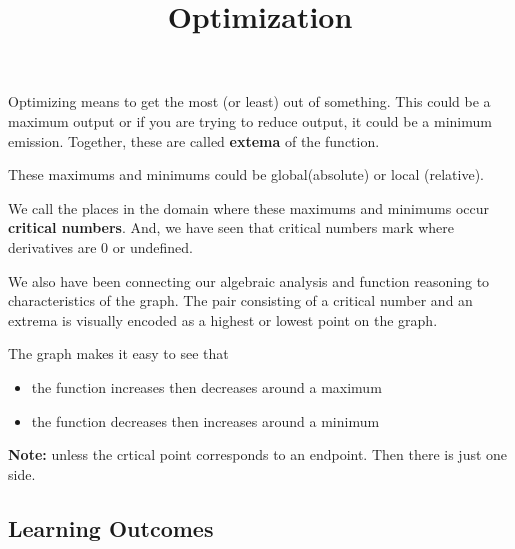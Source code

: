 \documentclass{ximera}
\title{Optimization}
\begin{document}
\begin{abstract}
\end{abstract}
\maketitle








Optimizing means to get the most (or least) out of something.  This could be a maximum output or if you are trying to reduce output, it could be a minimum emission. Together, these are called \textbf{extema} of the function.

These maximums and minimums could be global(absolute) or local (relative).


We call the places in the domain where these maximums and minimums occur \textbf{critical numbers}.  And, we have seen that critical numbers mark where derivatives are $0$ or undefined.


We also have been connecting our algebraic analysis and function reasoning to characteristics of the graph.  The pair consisting of a critical number and an extrema is visually encoded as a highest or lowest point on the graph.

The graph makes it easy to see that 

\begin{itemize}
\item the function increases then decreases around a maximum
\item the function decreases then increases around a minimum
\end{itemize}

\textbf{Note:} unless the crtical point corresponds to an endpoint.  Then there is just one side.


















\subsection{Learning Outcomes}
\end{document}
